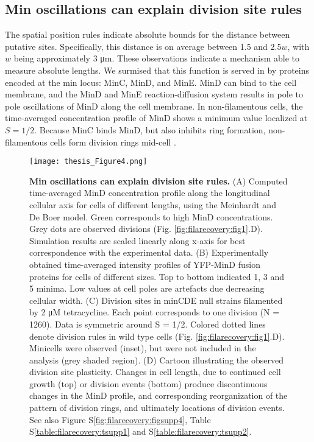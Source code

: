 \subsection{Min oscillations can explain division site rules}
The spatial position rules indicate absolute bounds for the distance between putative sites. Specifically, this distance is on average between 1.5 and 2.5$w$, with $w$ being approximately 3 μm. These observations indicate a mechanism able to measure absolute lengths. We surmised that this function is served in \ecoli by proteins encoded at the min locus: MinC, MinD, and MinE. MinD can bind to the cell membrane, and the MinD and MinE reaction-diffusion system results in pole to pole oscillations of MinD along the cell membrane. In non-filamentous cells, the time-averaged concentration profile of MinD shows a minimum value localized at $S = 1/2$. Because MinC binds MinD, but also inhibits ring formation, non-filamentous cells form division rings mid-cell \cite{Loose2011, Raskin1999}. 

\begin{figure}
    \centering
    \texttt{[image: thesis\_Figure4.png]}
    \caption{ 
        \textbf{Min oscillations can explain division site rules.}           
        (A) Computed time-averaged MinD concentration profile along the longitudinal cellular axis for cells of different lengths, using the Meinhardt and De Boer \cite{Meinhardt2001} model. Green corresponds to high MinD concentrations. Grey dots are observed divisions (Fig. \ref{fig:filarecovery:fig1}.D). Simulation results are scaled linearly along x-axis for best correspondence with the experimental data. (B) Experimentally obtained time-averaged intensity profiles of YFP-MinD fusion proteins for cells of different sizes. Top to bottom indicated 1, 3 and 5 minima. Low values at cell poles are artefacts due decreasing cellular width. (C) Division sites in minCDE null strains filamented by 2 μM tetracycline. Each point corresponds to one division (N = 1260). Data is symmetric around S = 1/2. Colored dotted lines denote division rules in wild type cells (Fig. \ref{fig:filarecovery:fig1}.D). Minicells were observed (inset), but were not included in the analysis (grey shaded region).  (D) Cartoon illustrating the observed division site plasticity. Changes in cell length, due to continued cell growth (top) or division events (bottom) produce discontinuous changes in the MinD profile, and corresponding reorganization of the pattern of division rings, and ultimately locations of division events. See also Figure S\ref{fig:filarecovery:figsupp4}, Table S\ref{table:filarecovery:tsupp1} and S\ref{table:filarecovery:tsupp2}.        
    }
    \label{fig:filarecovery:fig4}
\end{figure}

